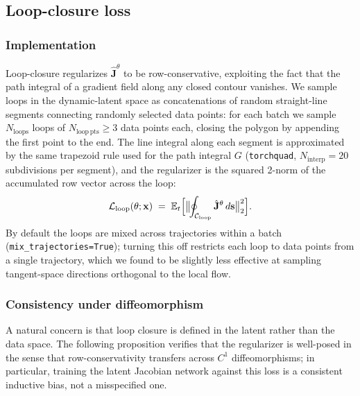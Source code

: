 \subsection{Loop-closure loss}\label{supp:interareal-control-loop-loss}

\subsubsection{Implementation}\label{supp:interareal-control-loop-impl}

Loop-closure regularizes $\hat{\mathbf{J}}^{\theta}$ to be row-conservative, exploiting the fact that the path integral of a gradient field along any closed contour vanishes. We sample loops in the dynamic-latent space as concatenations of random straight-line segments connecting randomly selected data points: for each batch we sample $N_{\mathrm{loops}}$ loops of $N_{\mathrm{loop\,pts}}\geq 3$ data points each, closing the polygon by appending the first point to the end. The line integral along each segment is approximated by the same trapezoid rule used for the path integral $G$ (\texttt{torchquad}, $N_{\mathrm{interp}}=20$ subdivisions per segment), and the regularizer is the squared 2-norm of the accumulated row vector across the loop:
\begin{equation}
\mathcal{L}_{\mathrm{loop}}(\theta;\vb{x}) \;=\; \mathbb{E}_{t}\Bigl[\bigl\|\!\oint_{\mathcal{C}_{\mathrm{loop}}}\hat{\mathbf{J}}^{\theta}\,d\vb{s}\bigr\|_{2}^{2}\Bigr].
\end{equation}
By default the loops are mixed across trajectories within a batch (\texttt{mix\_trajectories=True}); turning this off restricts each loop to data points from a single trajectory, which we found to be slightly less effective at sampling tangent-space directions orthogonal to the local flow.

\subsubsection{Consistency under diffeomorphism}\label{supp:interareal-control-loop-transfer}

A natural concern is that loop closure is defined in the latent rather than the data space. The following proposition verifies that the regularizer is well-posed in the sense that row-conservativity transfers across $C^{1}$ diffeomorphisms; in particular, training the latent Jacobian network against this loss is a consistent inductive bias, not a misspecified one.

